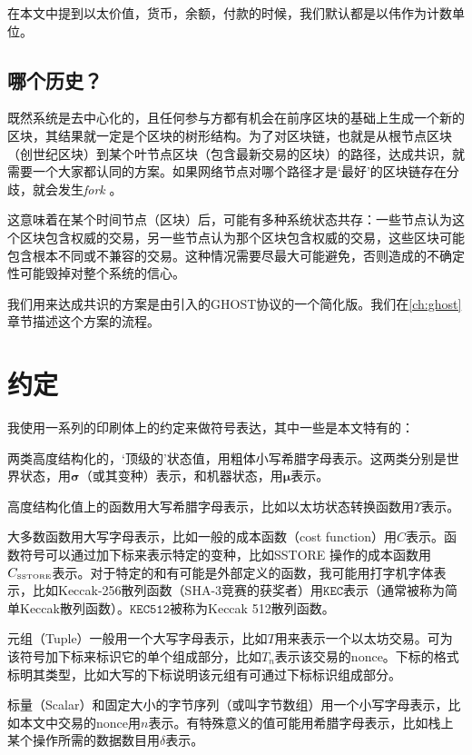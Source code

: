 \documentclass[UTF8,nofonts]{ctexart}
\begin{document}
\begin{multicols}{2}
在本文中提到以太价值，货币，余额，付款的时候，我们默认都是以伟作为计数单位。

\subsection{哪个历史？}

既然系统是去中心化的，且任何参与方都有机会在前序区块的基础上生成一个新的区块，其结果就一定是个区块的树形结构。为了对区块链，也就是从根节点区块（创世纪区块）到某个叶节点区块（包含最新交易的区块）的路径，达成共识，就需要一个大家都认同的方案。如果网络节点对哪个路径才是`最好'的区块链存在分歧，就会发生\textit{fork} 。

这意味着在某个时间节点（区块）后，可能有多种系统状态共存：一些节点认为这个区块包含权威的交易，另一些节点认为那个区块包含权威的交易，这些区块可能包含根本不同或不兼容的交易。这种情况需要尽最大可能避免，否则造成的不确定性可能毁掉对整个系统的信心。

我们用来达成共识的方案是由\cite{cryptoeprint:2013:881}引入的GHOST协议的一个简化版。我们在\ref{ch:ghost}章节描述这个方案的流程。


\section{约定}\label{ch:conventions}

我使用一系列的印刷体上的约定来做符号表达，其中一些是本文特有的：

两类高度结构化的，`顶级的'状态值，用粗体小写希腊字母表示。这两类分别是世界状态，用$\boldsymbol{\sigma}$（或其变种）表示，和机器状态，用$\boldsymbol{\mu}$表示。

高度结构化值上的函数用大写希腊字母表示，比如以太坊状态转换函数用$\Upsilon$表示。

大多数函数用大写字母表示，比如一般的成本函数（cost function）用$C$表示。函数符号可以通过加下标来表示特定的变种，比如{\tiny SSTORE} 操作的成本函数用$C_\text{\tiny SSTORE}$表示。对于特定的和有可能是外部定义的函数，我可能用打字机字体表示，比如Keccak-256散列函数（SHA-3竞赛的获奖者）用$\texttt{KEC}$表示（通常被称为简单Keccak散列函数）。$\texttt{KEC512}$被称为Keccak 512散列函数。

元组（Tuple）一般用一个大写字母表示，比如$T$用来表示一个以太坊交易。可为该符号加下标来标识它的单个组成部分，比如$T_n$表示该交易的nonce。下标的格式标明其类型，比如大写的下标说明该元组有可通过下标标识组成部分。

标量（Scalar）和固定大小的字节序列（或叫字节数组）用一个小写字母表示，比如本文中交易的nonce用$n$表示。有特殊意义的值可能用希腊字母表示，比如栈上某个操作所需的数据数目用$\delta$表示。


\end{multicols}
\end{document}
